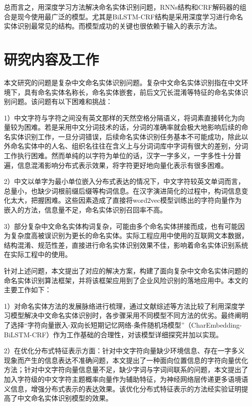 \documentclass[winfonts,master,oneside,nobackinfo]{njuthesis}
\begin{document}
总而言之，用深度学习方法解决命名实体识别问题，RNNs结构和CRF解码器的组合是现今使用最广泛的模型。尤其是BiLSTM-CRF结构是采用深度学习进行命名实体识别最常见的结构。而模型成功的关键也很依赖于输入的表示方法。

\section{研究内容及工作}
本文研究的问题是复杂中文命名实体识别问题。复杂中文命名实体识别指在中文环境下，具有命名实体名称长，命名实体嵌套，前后文冗长混淆等特征的命名实体识别问题。该问题有以下困难和挑战：

1）中文字符与字符之间没有英文那样的天然空格分隔语义，将词素直接转化为向量较为困难。若是采用中文分词技术的话，分词的准确率就会极大地影响后续的命名实体识别工作，一旦分词错误，后续命名实体识别任务基本不可能成功，除此以外命名实体中的人名、组织名往往在含义上与分词词库中字词有很大的差别，分词工作执行困难。然而单纯的以字符为单位的话，汉字一字多义，一字多性十分普遍，信息混淆影响分布式表示效果，将字符更好地向量化表示有很多困难。

2）中文以单字为最小单位嵌入分布式表达的情况下，中文字符较英文单词而言，总量小，也缺少词根前缀后缀等构词信息。在汉字演进简化的过程中，构词信息变化太大，把握困难。这些因素造成了直接将word2vec模型训练出的字符向量作为嵌入的方法，信息量不足，命名实体识别召回率不高。

3）部分复杂中文命名实体构词复杂，可能由多个命名实体拼接而成，也有可能因为复杂度高被误识别为更长的命名实体。实际工程应用中使用的互联网文本数据，结构混淆、规范性差，直接进行命名实体识别效果不佳，影响着命名实体识别系统在实际工程中的使用。

针对上述问题，本文提出了对应的解决方案，构建了面向复杂中文命名实体问题的命名实体识别算法框架，并将该框架应用到了企业风险识别的落地应用中。本文的主要工作如下：

1）对命名实体方法的发展脉络进行梳理，通过文献综述等方法比较了利用深度学习模型解决中文命名实体识别时，各步骤采用不同模型不同方法的优劣。最终阐明了选择“字符向量嵌入-双向长短期记忆网络-条件随机场模型”（CharEmbedding-BiLSTM-CRF）作为工作基础的合理性，对该模型详细探究并加以实现。

2）在优化分布式特征表示方面：针对中文字符向量缺少环境信息、存在一字多义现象而产生的信息表达不准确问题，本文提出了一种面向位置信息的字符向量优化方法；针对中文字符向量信息量不足，缺少字词与字词间联系的问题，本文提出了加入字符级的中文字符主题概率向量作为辅助特征，为神经网络层传递更多语境语义信息，增强分布式表示的表达效果。该优化分布式特征表示的方法经实验证明提高了中文命名实体识别模型的效果。
\end{document}
